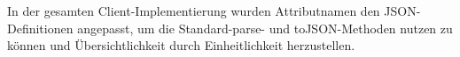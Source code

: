 In der gesamten Client-Implementierung wurden Attributnamen den JSON-Definitionen angepasst, um die Standard-parse- und toJSON-Methoden nutzen zu können und Übersichtlichkeit durch Einheitlichkeit herzustellen.





